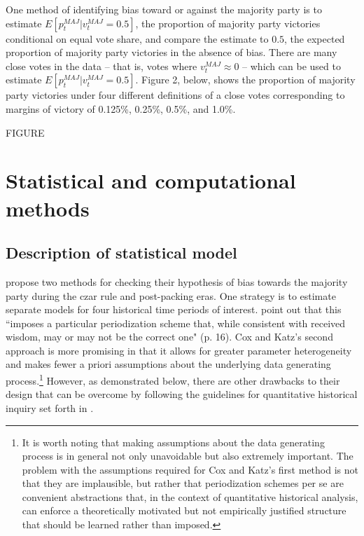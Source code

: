 One method of identifying bias toward or against the majority party is to estimate $E[p_t^{MAJ} |v_t^{MAJ}=0.5]$, the proportion of majority party victories conditional on equal vote share, and compare the estimate to $0.5$, the expected proportion of majority party victories in the absence of bias.  There are many close votes in the data -- that is, votes where $v_t^{MAJ} \approx 0$ -- which can be used to estimate $E[p_t^{MAJ} |v_t^{MAJ}=0.5]$.  Figure 2, below, shows the proportion of majority party victories under four different definitions of a close votes corresponding to margins of victory of 0.125\%, 0.25\%, 0.5\%, and 1.0\%. 

\vskip1cm
FIGURE
\vskip1cm

\section{Statistical and computational methods}
\subsection{Description of statistical model}
\label{subsection_methods}

 propose two methods for checking their hypothesis of bias towards the majority party during the czar rule and post-packing eras. One strategy is to estimate separate models for four historical time periods of interest.  point out that this ``imposes a particular periodization scheme that, while consistent with received wisdom, may or may not be the correct one" (p. 16). Cox and Katz's second approach is more promising in that it allows for greater parameter heterogeneity and makes fewer a priori assumptions about the underlying data generating process.\footnote{It is worth noting that making assumptions about the data generating process is in general not only unavoidable but also extremely important. The problem with the assumptions required for Cox and Katz's first method is not that they are implausible, but rather that periodization schemes per se are convenient abstractions that, in the context of quantitative historical analysis, can enforce a theoretically motivated but not empirically justified structure that should be learned rather than imposed.} However, as demonstrated below, there are other drawbacks to their design that can be overcome by following the guidelines for quantitative historical inquiry set forth in . 

